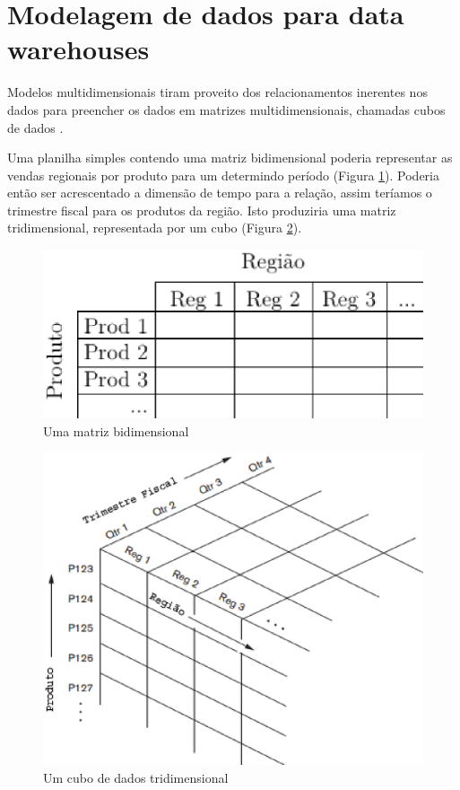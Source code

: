 \section{Modelagem de dados para data warehouses}\label{sec:modelagem-dw}

Modelos multidimensionais tiram proveito dos relacionamentos inerentes nos dados para preencher os dados em matrizes multidimensionais, chamadas cubos de dados \cite{elmasri_sistemas_2011}.

Uma planilha simples contendo uma matriz bidimensional poderia representar as vendas regionais por produto para um determindo período (Figura \ref{fig:bidimensional-dw}). Poderia então ser acrescentado a dimensão de tempo para a relação, assim teríamos o trimestre fiscal para os produtos da região. Isto produziria uma matriz tridimensional, representada por um cubo (Figura \ref{fig:cubo-dw}).


\begin{figure}[h!]
\centering
\includegraphics[keepaspectratio=false,scale=0.65]{figuras/figuras_pedro/bidimensional.eps}
\caption{Uma matriz bidimensional}
\label{fig:bidimensional-dw}
\end{figure}
\FloatBarrier


\begin{figure}[h!]
\centering
\includegraphics[keepaspectratio=false,scale=0.65]{figuras/figuras_pedro/cubo.eps}
\caption{Um cubo de dados tridimensional}
\label{fig:cubo-dw}
\end{figure}
\FloatBarrier

